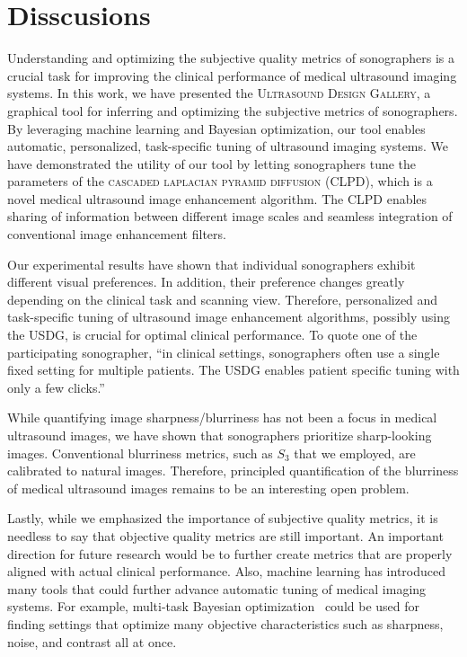 
\vspace{-0.05in}
\section{Disscusions}\label{section:conclusion}
Understanding and optimizing the subjective quality metrics of sonographers is a crucial task for improving the clinical performance of medical ultrasound imaging systems.
In this work, we have presented the \textsc{Ultrasound Design Gallery}, a graphical tool for inferring and optimizing the subjective metrics of sonographers.
By leveraging machine learning and Bayesian optimization, our tool enables automatic, personalized, task-specific tuning of ultrasound imaging systems.
We have demonstrated the utility of our tool by letting sonographers tune the parameters of the \textsc{cascaded laplacian pyramid diffusion} (CLPD), which is a novel medical ultrasound image enhancement algorithm.
The CLPD enables sharing of information between different image scales and seamless integration of conventional image enhancement filters.

Our experimental results have shown that individual sonographers exhibit different visual preferences.
In addition, their preference changes greatly depending on the clinical task and scanning view.
Therefore, personalized and task-specific tuning of ultrasound image enhancement algorithms, possibly using the USDG, is crucial for optimal clinical performance.
  To quote one of the participating sonographer, ``in clinical settings, sonographers often use a single fixed setting for multiple patients.
  The USDG enables patient specific tuning with only a few clicks.'' 

While quantifying image sharpness/blurriness has not been a focus in medical ultrasound images, we have shown that sonographers prioritize sharp-looking images.
Conventional blurriness metrics, such as \(S_3\) that we employed, are calibrated to natural images.
Therefore, principled quantification of the blurriness of medical ultrasound images remains to be an interesting open problem.

Lastly, while we emphasized the importance of subjective quality metrics, it is needless to say that objective quality metrics are still important.
An important direction for future research would be to further create metrics that are properly aligned with actual clinical performance.
Also, machine learning has introduced many tools that could further advance automatic tuning of medical imaging systems.
For example, multi-task Bayesian optimization~\cite{NIPS2013_f33ba15e} could be used for finding settings that optimize many objective characteristics such as sharpness, noise, and contrast all at once.


